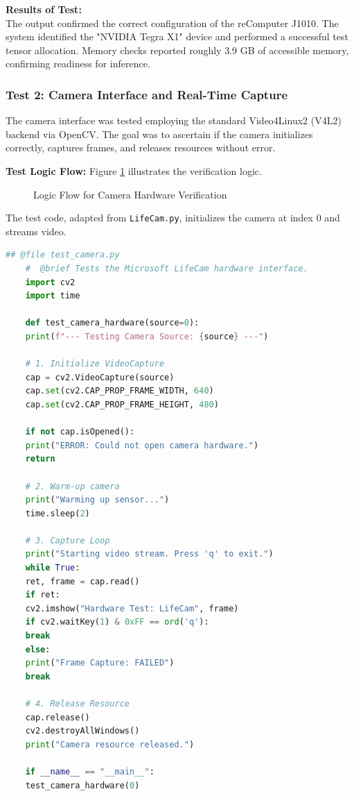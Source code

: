 \textbf{Results of Test:} \\
The output confirmed the correct configuration of the reComputer J1010. The system identified the "NVIDIA Tegra X1" device and performed a successful test tensor allocation. Memory checks reported roughly 3.9 GB of accessible memory, confirming readiness for inference.

\subsubsection{Test 2: Camera Interface and Real-Time Capture}

The camera interface was tested employing the standard Video4Linux2 (V4L2) backend via OpenCV. The goal was to ascertain if the camera initializes correctly, captures frames, and releases resources without error.

\textbf{Test Logic Flow:}
Figure \ref{fig:cam_test_flow} illustrates the verification logic.

\begin{figure}[h]
	\centering
	
	\caption{Logic Flow for Camera Hardware Verification}
	\label{fig:cam_test_flow}
\end{figure}

The test code, adapted from \texttt{LifeCam.py}, initializes the camera at index 0 and streams video.

\begin{lstlisting}[language=Python, caption={OpenCV Script for Camera Hardware Testing}, label={lst:cam_test}]
	## @file test_camera.py
	#  @brief Tests the Microsoft LifeCam hardware interface.
	import cv2
	import time
	
	def test_camera_hardware(source=0):
	print(f"--- Testing Camera Source: {source} ---")
	
	# 1. Initialize VideoCapture
	cap = cv2.VideoCapture(source)
	cap.set(cv2.CAP_PROP_FRAME_WIDTH, 640)
	cap.set(cv2.CAP_PROP_FRAME_HEIGHT, 480)
	
	if not cap.isOpened():
	print("ERROR: Could not open camera hardware.")
	return
	
	# 2. Warm-up camera
	print("Warming up sensor...")
	time.sleep(2)
	
	# 3. Capture Loop
	print("Starting video stream. Press 'q' to exit.")
	while True:
	ret, frame = cap.read()
	if ret:
	cv2.imshow("Hardware Test: LifeCam", frame)
	if cv2.waitKey(1) & 0xFF == ord('q'):
	break
	else:
	print("Frame Capture: FAILED")
	break
	
	# 4. Release Resource
	cap.release()
	cv2.destroyAllWindows()
	print("Camera resource released.")
	
	if __name__ == "__main__":
	test_camera_hardware(0)
\end{lstlisting}

